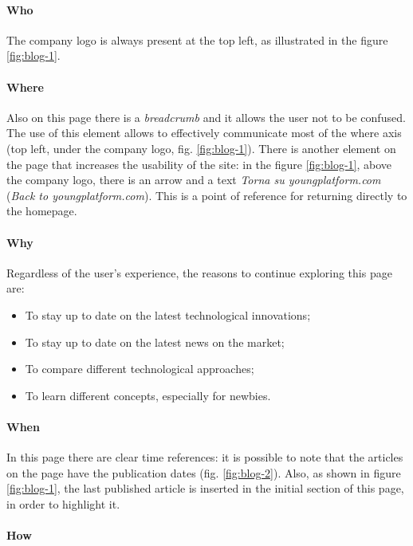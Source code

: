 \paragraph{Who}

The company logo is always present at the top left, as illustrated
in the figure \ref{fig:blog-1}.

\paragraph{Where}

Also on this page there is a \textit{breadcrumb} and it allows the user 
not to be confused. The use of this element allows to effectively 
communicate most of the where axis (top left, under the company logo, 
fig. \ref{fig:blog-1}). There is another element on the page that 
increases the usability of the site: in the figure \ref{fig:blog-1}, above 
the company logo, there is an arrow and a text 
\textit{Torna su youngplatform.com} (\textit{Back to youngplatform.com}). 
This is a point of reference for returning directly to the homepage.

\paragraph{Why}

Regardless of the user's experience, the reasons to continue exploring 
this page are:
\begin{itemize}
  \item To stay up to date on the latest technological innovations;
  \item To stay up to date on the latest news on the market;
  \item To compare different technological approaches;
  \item To learn different concepts, especially for newbies.
\end{itemize}

\paragraph{When}

In this page there are clear time references: it is possible to note that 
the articles on the page have the publication dates (fig. 
\ref{fig:blog-2}). Also, as shown in figure \ref{fig:blog-1}, the last 
published article is inserted in the initial section of this page, in 
order to highlight it.

\paragraph{How}

